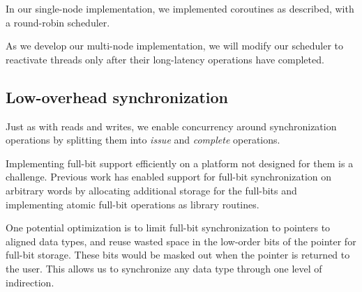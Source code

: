 \documentclass[10pt,nocopyrightspace]{sigplanconf}
\begin{document}
In our single-node implementation, we implemented coroutines
as described, with a round-robin scheduler. 

As we develop our multi-node implementation, we will modify our
scheduler to reactivate threads only after their long-latency operations
have completed.


\subsection{Low-overhead synchronization}

Just as with reads and writes, we enable concurrency around
synchronization operations by splitting them into {\em issue} and {\em
  complete} operations.

Implementing full-bit support efficiently on a platform not
designed for them is a challenge. Previous work \cite{qthreads} has
enabled support for full-bit synchronization on arbitrary words by
allocating additional storage for the full-bits and implementing
atomic full-bit operations as library routines.

One potential optimization is to limit full-bit synchronization to
pointers to aligned data types, and reuse wasted space in the
low-order bits of the pointer for full-bit storage. These bits
would be masked out when the pointer is returned to the user.  This
allows us to synchronize any data type through one level of
indirection.
\end{document}
